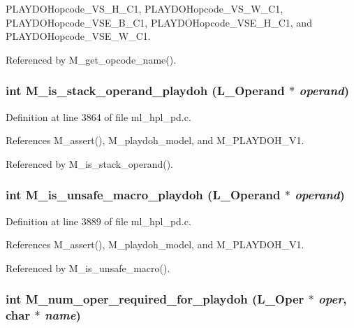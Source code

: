 PLAYDOHopcode\_\-VS\_\-H\_\-C1, PLAYDOHopcode\_\-VS\_\-W\_\-C1, PLAYDOHopcode\_\-VSE\_\-B\_\-C1, PLAYDOHopcode\_\-VSE\_\-H\_\-C1, and PLAYDOHopcode\_\-VSE\_\-W\_\-C1.

Referenced by M\_\-get\_\-opcode\_\-name().
\subsubsection{\setlength{\rightskip}{0pt plus 5cm}int M\_\-is\_\-stack\_\-operand\_\-playdoh (L\_\-Operand $\ast$ {\em operand})}\label{ml__hpl__pd_8c_de3b4e27d7ba3212eda5946a706379d1}




Definition at line 3864 of file ml\_\-hpl\_\-pd.c.

References M\_\-assert(), M\_\-playdoh\_\-model, and M\_\-PLAYDOH\_\-V1.

Referenced by M\_\-is\_\-stack\_\-operand().
\subsubsection{\setlength{\rightskip}{0pt plus 5cm}int M\_\-is\_\-unsafe\_\-macro\_\-playdoh (L\_\-Operand $\ast$ {\em operand})}\label{ml__hpl__pd_8c_f94b6da343544a0cca9062e9aff5c2c0}




Definition at line 3889 of file ml\_\-hpl\_\-pd.c.

References M\_\-assert(), M\_\-playdoh\_\-model, and M\_\-PLAYDOH\_\-V1.

Referenced by M\_\-is\_\-unsafe\_\-macro().
\subsubsection{\setlength{\rightskip}{0pt plus 5cm}int M\_\-num\_\-oper\_\-required\_\-for\_\-playdoh (L\_\-Oper $\ast$ {\em oper}, char $\ast$ {\em name})}\label{ml__hpl__pd_8c_c21dbc641e9d5e5926b5aa0e58a404a6}




